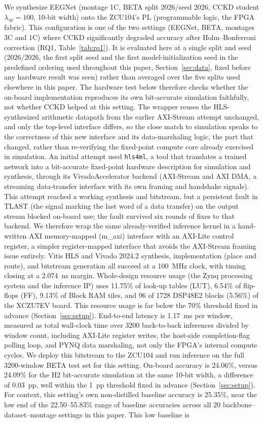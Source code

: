 \documentclass[11pt,a4paper,twoside,asymmetric]{article}
\begin{document}
We synthesize EEGNet (montage 1C, BETA split 2026/seed 2026, CCKD student $\lambda_{sp}=100$, 10-bit width) onto the ZCU104's PL (programmable logic, the FPGA fabric). This configuration is one of the two settings (EEGNet, BETA, montages 3C and 1C) where CCKD significantly degraded accuracy after Holm--Bonferroni correction (RQ1, Table~\ref{tab:rq1}). It is evaluated here at a single split and seed (2026/2026, the first split seed and the first model-initialization seed in the predefined ordering used throughout this paper, Section~\ref{sec:data}, fixed before any hardware result was seen) rather than averaged over the five splits used elsewhere in this paper. The hardware test below therefore checks whether the on-board implementation reproduces its own bit-accurate simulation faithfully, not whether CCKD helped at this setting. The wrapper reuses the HLS-synthesized arithmetic datapath from the earlier AXI-Stream attempt unchanged, and only the top-level interface differs, so the close match to simulation speaks to the correctness of this new interface and its data-marshaling logic, the part that changed, rather than re-verifying the fixed-point compute core already exercised in simulation. An initial attempt used \texttt{hls4ml}, a tool that translates a trained network into a bit-accurate fixed-point hardware description for simulation and synthesis, through its VivadoAccelerator backend (AXI-Stream and AXI DMA, a streaming data-transfer interface with its own framing and handshake signals). This attempt reached a working synthesis and bitstream, but a persistent fault in TLAST (the signal marking the last word of a data transfer) on the output stream blocked on-board use; the fault survived six rounds of fixes to that backend. We therefore wrap the same already-verified inference kernel in a hand-written AXI memory-mapped (m\_axi) interface with an AXI-Lite control register, a simpler register-mapped interface that avoids the AXI-Stream framing issue entirely. Vitis HLS and Vivado 2024.2 synthesis, implementation (place and route), and bitstream generation all succeed at a 100~MHz clock, with timing closing at a 2.074~ns margin. Whole-design resource usage (the Zynq processing system and the inference IP) uses 11.75\% of look-up tables (LUT), 6.54\% of flip-flops (FF), 9.13\% of Block RAM tiles, and 96 of 1728 DSP48E2 blocks (5.56\%) of the XCZU7EV board. This resource usage is far below the 70\% threshold fixed in advance (Section~\ref{sec:setup}). End-to-end latency is 1.17~ms per window, measured as total wall-clock time over 3200 back-to-back inferences divided by window count, including AXI-Lite register writes, the host-side completion-flag polling loop, and PYNQ data marshaling, not only the FPGA's internal compute cycles. We deploy this bitstream to the ZCU104 and run inference on the full 3200-window BETA test set for this setting. On-board accuracy is 24.06\%, versus 24.09\% for the H2 bit-accurate simulation at the same 10-bit width, a difference of 0.03~pp, well within the 1~pp threshold fixed in advance (Section~\ref{sec:setup}). For context, this setting's own non-distilled baseline accuracy is 25.35\%, near the low end of the 22.50--55.83\% range of baseline accuracies across all 20 backbone--dataset--montage settings in this paper. This low baseline is 
\end{document}
